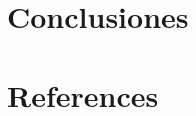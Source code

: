 \documentclass[12pt]{report}
\begin{document}
{\clearpage

\section{Conclusiones}



\newpage
\section*{References}

}
\end{document}
